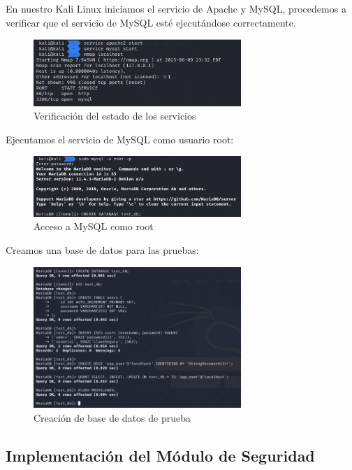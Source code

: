 \documentclass[12pt,a4paper]{article}
\begin{document}
En nuestro Kali Linux iniciamos el servicio de Apache y MySQL, procedemos a
verificar que el servicio de MySQL esté ejecutándose correctamente.

\begin{figure}[H]
    \centering
    \includegraphics[width=0.7\textwidth]{./assets/img1.png}
    \caption{Verificación del estado de los servicios}
    \label{fig:servicios-estado}
\end{figure}

Ejecutamos el servicio de MySQL como usuario root:

\begin{figure}[H]
    \centering
    \includegraphics[width=0.7\textwidth]{./assets/img2.png}
    \caption{Acceso a MySQL como root}
    \label{fig:mysql-root}
\end{figure}

Creamos una base de datos para las pruebas:

\begin{figure}[H]
    \centering
    \includegraphics[width=0.7\textwidth]{./assets/img3.png}
    \caption{Creación de base de datos de prueba}
    \label{fig:db-creacion}
\end{figure}

\subsection{Implementación del Módulo de Seguridad}
\end{document}
